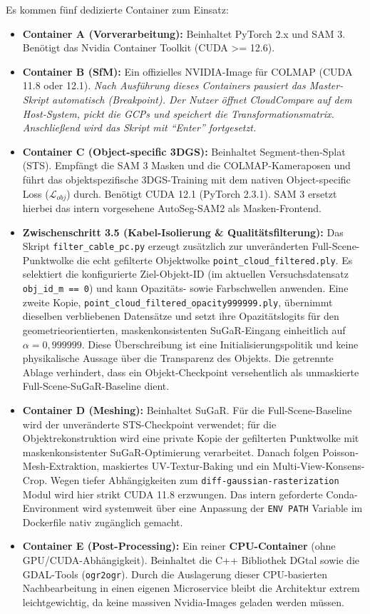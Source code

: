 \documentclass[12pt,a4paper]{article}
\begin{document}
Es kommen fünf dedizierte Container zum Einsatz:
\begin{itemize}
    \item \textbf{Container A (Vorverarbeitung):} Beinhaltet PyTorch 2.x und SAM 3. Benötigt das Nvidia Container Toolkit (CUDA >= 12.6).
    \item \textbf{Container B (SfM):} Ein offizielles NVIDIA-Image für COLMAP (CUDA 11.8 oder 12.1). \textit{Nach Ausführung dieses Containers pausiert das Master-Skript automatisch (Breakpoint). Der Nutzer öffnet CloudCompare auf dem Host-System, pickt die GCPs und speichert die Transformationsmatrix. Anschließend wird das Skript mit ``Enter'' fortgesetzt.}
    \item \textbf{Container C (Object-specific 3DGS):} Beinhaltet Segment-then-Splat (STS). Empfängt die SAM 3 Masken und die COLMAP-Kameraposen und führt das objektspezifische 3DGS-Training mit dem nativen Object-specific Loss ($\mathcal{L}_{obj}$) durch. Benötigt CUDA 12.1 (PyTorch 2.3.1). SAM 3 ersetzt hierbei das intern vorgesehene AutoSeg-SAM2 als Masken-Frontend.
    \item \textbf{Zwischenschritt 3.5 (Kabel-Isolierung \& Qualitätsfilterung):} Das Skript \texttt{filter\_cable\_pc.py} erzeugt zusätzlich zur unveränderten Full-Scene-Punktwolke die echt gefilterte Objektwolke \texttt{point\_cloud\_filtered.ply}. Es selektiert die konfigurierte Ziel-Objekt-ID (im aktuellen Versuchsdatensatz \texttt{obj\_id\_m == 0}) und kann Opazitäts- sowie Farbschwellen anwenden. Eine zweite Kopie, \texttt{point\_cloud\_filtered\_opacity999999.ply}, übernimmt dieselben verbliebenen Datensätze und setzt ihre Opazitätslogits für den geometrieorientierten, maskenkonsistenten SuGaR-Eingang einheitlich auf \(\alpha=0{,}999999\). Diese Überschreibung ist eine Initialisierungspolitik und keine physikalische Aussage über die Transparenz des Objekts. Die getrennte Ablage verhindert, dass ein Objekt-Checkpoint versehentlich als unmaskierte Full-Scene-SuGaR-Baseline dient.
    \item \textbf{Container D (Meshing):} Beinhaltet SuGaR. Für die Full-Scene-Baseline wird der unveränderte STS-Checkpoint verwendet; für die Objektrekonstruktion wird eine private Kopie der gefilterten Punktwolke mit maskenkonsistenter SuGaR-Optimierung verarbeitet. Danach folgen Poisson-Mesh-Extraktion, maskiertes UV-Textur-Baking und ein Multi-View-Konsens-Crop. Wegen tiefer Abhängigkeiten zum \texttt{diff-gaussian-rasterization} Modul wird hier strikt CUDA 11.8 erzwungen. Das intern geforderte Conda-Environment wird systemweit über eine Anpassung der \texttt{ENV PATH} Variable im Dockerfile nativ zugänglich gemacht.
    \item \textbf{Container E (Post-Processing):} Ein reiner \textbf{CPU-Container} (ohne GPU/CUDA-Abhängigkeit). Beinhaltet die C++ Bibliothek DGtal sowie die GDAL-Tools (\texttt{ogr2ogr}). Durch die Auslagerung dieser CPU-basierten Nachbearbeitung in einen eigenen Microservice bleibt die Architektur extrem leichtgewichtig, da keine massiven Nvidia-Images geladen werden müssen.
\end{itemize}
\end{document}
